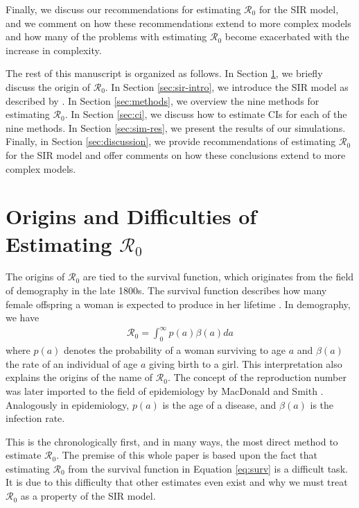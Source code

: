 \documentclass[12pt]{article}
\newcommand{\wxxsir}{nine } %
\newcommand{\rr}{\ensuremath{\mathcal{R}_0}}
\begin{document}
Finally, we discuss our recommendations for estimating $\rr$ for the SIR model, and we comment on how these recommendations extend to more complex models and how many of the problems with estimating $\rr$  become exacerbated with the increase in complexity.


The rest of this manuscript is organized as follows.  In Section \ref{sec:r0}, we briefly discuss the origin of $\rr$.  In Section \ref{sec:sir-intro}, we introduce the SIR model as described by \cite{Kermack700}.  In Section \ref{sec:methods}, we overview the \wxxsir methods for estimating $\rr$. In Section \ref{sec:ci}, we discuss how to estimate CIs for each of the \wxxsir methods.  In Section \ref{sec:sim-res}, we present the results of our simulations.  Finally, in Section \ref{sec:discussion}, we provide recommendations of estimating $\rr$ for the SIR model and offer comments on how these conclusions extend to more complex models.


\section{Origins and Difficulties of Estimating $\rr$}
\label{sec:r0}

The origins of $\rr$ are tied to the survival function, which originates from the field of demography in the late 1800s.  The survival function describes how many female offspring a woman is expected to produce in her lifetime \citep{dietz1993estimation}.  In demography, we have
\begin{align}\label{eq:surv}
\rr = \int_0^\infty p(a) \beta(a) da
\end{align}
where $p(a)$ denotes the probability of a woman surviving to age $a$ and $\beta(a)$ the rate of an individual of age $a$ giving birth to a  girl.   This interpretation also explains the origins of the name of $\rr$.  The concept of the reproduction number was later imported to the field of epidemiology by MacDonald and Smith \citep{dietz1993estimation}.  Analogously in epidemiology, $p(a)$ is the age of a disease, and $\beta(a)$ is the infection rate.

This is the chronologically first, and in many ways, the most direct method to estimate $\rr$.  The premise of this whole paper is based upon the fact that estimating $\rr$ from the survival function in Equation \eqref{eq:surv} is a difficult task.  It is due to this difficulty that other estimates even exist and why we must treat $\rr$ as a property of the SIR model.
\end{document}
